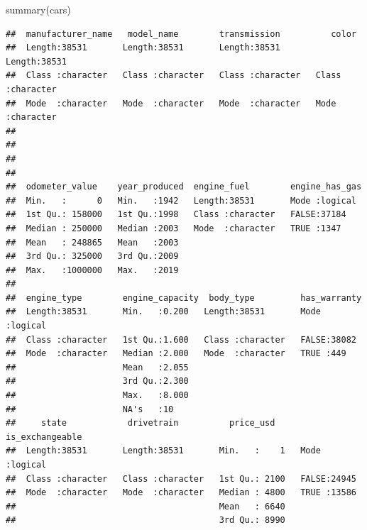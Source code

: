\documentclass[
]{article}
\newenvironment{Shaded}{\begin{snugshade}}{\end{snugshade}}
\newcommand{\FunctionTok}[1]{\textcolor[rgb]{0.00,0.00,0.00}{#1}}
\newcommand{\NormalTok}[1]{#1}
\begin{document}
\begin{Shaded}
\begin{Highlighting}[]
\FunctionTok{summary}\NormalTok{(cars)}
\end{Highlighting}
\end{Shaded}

\begin{verbatim}
##  manufacturer_name   model_name        transmission          color          
##  Length:38531       Length:38531       Length:38531       Length:38531      
##  Class :character   Class :character   Class :character   Class :character  
##  Mode  :character   Mode  :character   Mode  :character   Mode  :character  
##                                                                             
##                                                                             
##                                                                             
##                                                                             
##  odometer_value    year_produced  engine_fuel        engine_has_gas 
##  Min.   :      0   Min.   :1942   Length:38531       Mode :logical  
##  1st Qu.: 158000   1st Qu.:1998   Class :character   FALSE:37184    
##  Median : 250000   Median :2003   Mode  :character   TRUE :1347     
##  Mean   : 248865   Mean   :2003                                     
##  3rd Qu.: 325000   3rd Qu.:2009                                     
##  Max.   :1000000   Max.   :2019                                     
##                                                                     
##  engine_type        engine_capacity  body_type         has_warranty   
##  Length:38531       Min.   :0.200   Length:38531       Mode :logical  
##  Class :character   1st Qu.:1.600   Class :character   FALSE:38082    
##  Mode  :character   Median :2.000   Mode  :character   TRUE :449      
##                     Mean   :2.055                                     
##                     3rd Qu.:2.300                                     
##                     Max.   :8.000                                     
##                     NA's   :10                                        
##     state            drivetrain          price_usd     is_exchangeable
##  Length:38531       Length:38531       Min.   :    1   Mode :logical  
##  Class :character   Class :character   1st Qu.: 2100   FALSE:24945    
##  Mode  :character   Mode  :character   Median : 4800   TRUE :13586    
##                                        Mean   : 6640                  
##                                        3rd Qu.: 8990                  

\end{verbatim}
\end{document}
